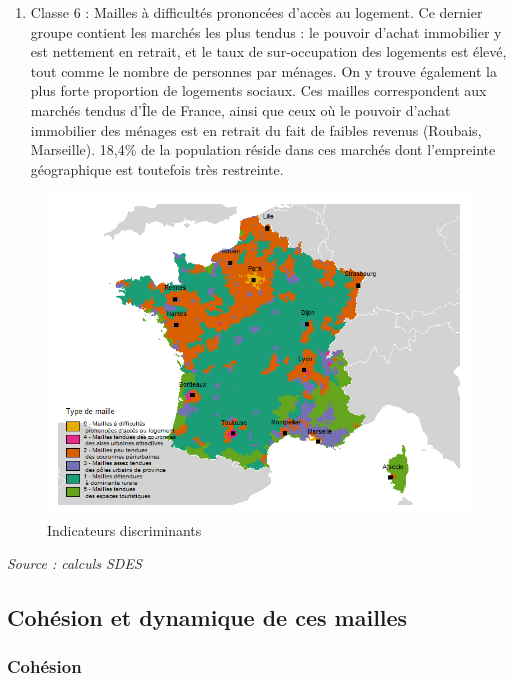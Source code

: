 \documentclass[12pt, a4paper]{article}
\begin{document}
\begin{enumerate}
\item Classe 6 : Mailles à difficultés prononcées d’accès au logement. Ce dernier groupe contient les marchés les plus tendus : le pouvoir d’achat immobilier y est nettement en retrait, et le taux de sur-occupation des logements est élevé, tout comme le nombre de personnes par ménages. On y trouve également la plus forte proportion de logements sociaux. Ces mailles correspondent aux marchés tendus d’Île de France, ainsi que ceux où le pouvoir d’achat immobilier des ménages est en retrait du fait de faibles revenus (Roubais, Marseille). 18,4\% de la population réside dans ces marchés dont l’empreinte géographique est toutefois très restreinte.
\end{enumerate}

\begin{figure}[H]
\caption{Indicateurs discriminants}
\begin{center}
\includegraphics[scale=.8]{img/Typo_mailles.png}
\end{center}
\end{figure}
\emph{Source : calculs SDES}

\subsection{Cohésion et dynamique de ces mailles}

\subsubsection{Cohésion}
\end{document}

